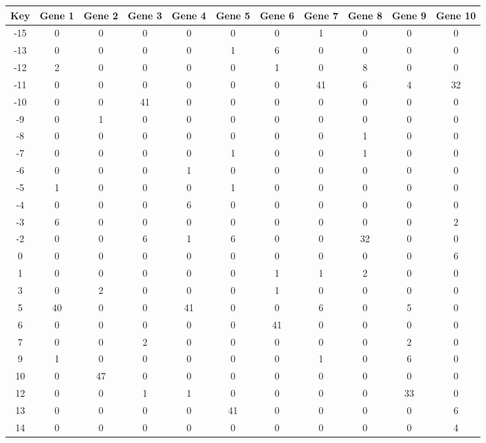 \begin{tabular}{|c|c|c|c|c|c|c|c|c|c|c|}
\hline
Key & Gene 1 & Gene 2 & Gene 3 & Gene 4 & Gene 5 & Gene 6 & Gene 7 & Gene 8 & Gene 9 & Gene 10 \\
\hline
-15 & 0 & 0 & 0 & 0 & 0 & 0 & 1 & 0 & 0 & 0 \\
-13 & 0 & 0 & 0 & 0 & 1 & 6 & 0 & 0 & 0 & 0 \\
-12 & 2 & 0 & 0 & 0 & 0 & 1 & 0 & 8 & 0 & 0 \\
-11 & 0 & 0 & 0 & 0 & 0 & 0 & 41 & 6 & 4 & 32 \\
-10 & 0 & 0 & 41 & 0 & 0 & 0 & 0 & 0 & 0 & 0 \\
-9 & 0 & 1 & 0 & 0 & 0 & 0 & 0 & 0 & 0 & 0 \\
-8 & 0 & 0 & 0 & 0 & 0 & 0 & 0 & 1 & 0 & 0 \\
-7 & 0 & 0 & 0 & 0 & 1 & 0 & 0 & 1 & 0 & 0 \\
-6 & 0 & 0 & 0 & 1 & 0 & 0 & 0 & 0 & 0 & 0 \\
-5 & 1 & 0 & 0 & 0 & 1 & 0 & 0 & 0 & 0 & 0 \\
-4 & 0 & 0 & 0 & 6 & 0 & 0 & 0 & 0 & 0 & 0 \\
-3 & 6 & 0 & 0 & 0 & 0 & 0 & 0 & 0 & 0 & 2 \\
-2 & 0 & 0 & 6 & 1 & 6 & 0 & 0 & 32 & 0 & 0 \\
0 & 0 & 0 & 0 & 0 & 0 & 0 & 0 & 0 & 0 & 6 \\
1 & 0 & 0 & 0 & 0 & 0 & 1 & 1 & 2 & 0 & 0 \\
3 & 0 & 2 & 0 & 0 & 0 & 1 & 0 & 0 & 0 & 0 \\
5 & 40 & 0 & 0 & 41 & 0 & 0 & 6 & 0 & 5 & 0 \\
6 & 0 & 0 & 0 & 0 & 0 & 41 & 0 & 0 & 0 & 0 \\
7 & 0 & 0 & 2 & 0 & 0 & 0 & 0 & 0 & 2 & 0 \\
9 & 1 & 0 & 0 & 0 & 0 & 0 & 1 & 0 & 6 & 0 \\
10 & 0 & 47 & 0 & 0 & 0 & 0 & 0 & 0 & 0 & 0 \\
12 & 0 & 0 & 1 & 1 & 0 & 0 & 0 & 0 & 33 & 0 \\
13 & 0 & 0 & 0 & 0 & 41 & 0 & 0 & 0 & 0 & 6 \\
14 & 0 & 0 & 0 & 0 & 0 & 0 & 0 & 0 & 0 & 4 \\
\hline
\end{tabular}